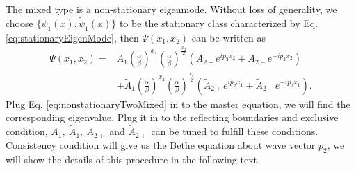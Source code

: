 The mixed type is a non-stationary eigenmode. Without loss of generality, we choose $\{\psi_1(x), \tilde{\psi}_1(x)\}$ to be the stationary class characterized by Eq.  \eqref{eq:stationaryEigenMode}, then $\Psi(x_1, x_2)$ can be written as
\begin{equation}
    \begin{aligned}
        \label{eq:nonstationaryTwoMixed}
        \Psi(x_1, x_2) = & A_{1}\left(\frac{\alpha}{\beta}\right)^{x_1} \left(\frac{\alpha}{\beta}\right)^{\frac{x_2}{2}} \left( A_{2+} e^{ip_2 x_2} + A_{2-} e^{-ip_2 x_2}\right) \\
        & + \tilde{A}_{1}\left(\frac{\alpha}{\beta}\right)^{x_2} \left( \frac{\alpha}{\beta}\right)^{\frac{x_1}{2}} \left( \tilde{A}_{2+} e^{ip_2 x_1} + \tilde{A}_{2-} e^{-ip_2 x_1}\right).
    \end{aligned}
\end{equation}
Plug Eq. \eqref{eq:nonstationaryTwoMixed} in to the master equation, we will find the corresponding eigenvalue. Plug it in to the reflecting boundaries and exclusive condition, $A_{1},~\tilde{A}_{1},~A_{2\pm}$ and $\tilde{A}_{2\pm}$ can be tuned to fulfill these conditions. Consistency condition will give us the Bethe equation about wave vector $p_2$, we will show the details of this procedure in the following text.

